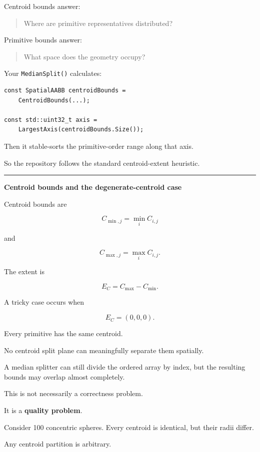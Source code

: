 Centroid bounds answer:

\begin{quote}
Where are primitive representatives distributed?
\end{quote}

Primitive bounds answer:

\begin{quote}
What space does the geometry occupy?
\end{quote}

Your \texttt{MedianSplit()} calculates:

\begin{verbatim}
const SpatialAABB centroidBounds =
    CentroidBounds(...);

const std::uint32_t axis =
    LargestAxis(centroidBounds.Size());
\end{verbatim}

Then it stable-sorts the primitive-order range along that axis.

So the repository follows the standard centroid-extent heuristic.

\begin{center}\rule{0.5\linewidth}{0.5pt}\end{center}

\textbf{Centroid bounds and the degenerate-centroid case}

Centroid bounds are

\[
C_{\min,j}
=
\min_i C_{i,j}
\]

and

\[
C_{\max,j}
=
\max_i C_{i,j}.
\]

The extent is

\[
E_C=C_{\max}-C_{\min}.
\]

A tricky case occurs when

\[
E_C=(0,0,0).
\]

Every primitive has the same centroid.

No centroid split plane can meaningfully separate them spatially.

A median splitter can still divide the ordered array by index, but the resulting bounds may overlap almost completely.

This is not necessarily a correctness problem.

It is a \textbf{quality problem}.

Consider 100 concentric spheres. Every centroid is identical, but their radii differ.

Any centroid partition is arbitrary.

